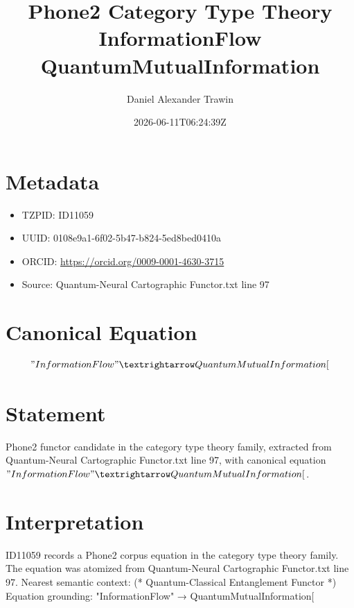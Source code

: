 \documentclass[11pt]{article}
\title{Phone2 Category Type Theory InformationFlow QuantumMutualInformation}
\author{Daniel Alexander Trawin}
\date{2026-06-11T06:24:39Z}
\begin{document}
\maketitle
\section*{Metadata}
\begin{itemize}
\item TZPID: ID11059
\item UUID: 0108e9a1-6f02-5b47-b824-5ed8bed0410a
\item ORCID: \url{https://orcid.org/0009-0001-4630-3715}
\item Source: Quantum-Neural Cartographic Functor.txt line 97
\end{itemize}
\section*{Canonical Equation}
\[
"InformationFlow" → QuantumMutualInformation[
\]
\section*{Statement}
Phone2 functor candidate in the category type theory family, extracted from Quantum-Neural Cartographic Functor.txt line 97, with canonical equation $"InformationFlow" → QuantumMutualInformation[$.
\section*{Interpretation}
ID11059 records a Phone2 corpus equation in the category type theory family. The equation was atomized from Quantum-Neural Cartographic Functor.txt line 97. Nearest semantic context: (* Quantum-Classical Entanglement Functor *) Equation grounding: "InformationFlow" → QuantumMutualInformation[
\end{document}
